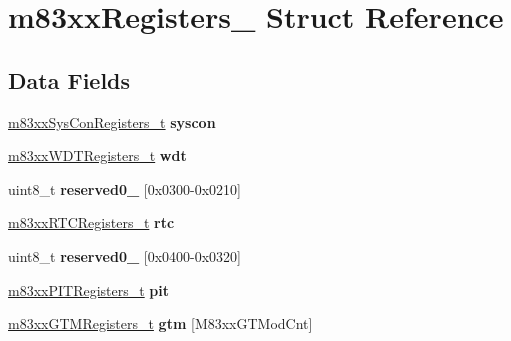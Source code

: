 \hypertarget{structm83xxRegisters__}{}\section{m83xx\+Registers\+\_\+ Struct Reference}
\label{structm83xxRegisters__}
\subsection*{Data Fields}
\begin{DoxyCompactItemize}
\item 
\mbox{\label{structm83xxRegisters___a3db926d60bc4e11d0660814325685067}} 
\mbox{\hyperlink{structm83xxSysConRegisters__}{m83xx\+Sys\+Con\+Registers\+\_\+t}} {\bfseries syscon}
\item 
\mbox{\label{structm83xxRegisters___ad7527072e45a12bfa753819727c296a1}} 
\mbox{\hyperlink{structm83xxWDTRegisters__}{m83xx\+W\+D\+T\+Registers\+\_\+t}} {\bfseries wdt}
\item 
\mbox{\label{structm83xxRegisters___adb3e4fbf90b1b339f04d4fd1d7b5da88}} 
uint8\+\_\+t {\bfseries reserved0\+\_} \mbox{[}0x0300-\/0x0210\mbox{]}
\item 
\mbox{\label{structm83xxRegisters___a16bb1b75ffe2c47d50eb5429d5a50d45}} 
\mbox{\hyperlink{structm83xxRTCRegisters__}{m83xx\+R\+T\+C\+Registers\+\_\+t}} {\bfseries rtc}
\item 
\mbox{\label{structm83xxRegisters___a587ef9fba32a6f0c7e4559eda399c5db}} 
uint8\+\_\+t {\bfseries reserved0\+\_} \mbox{[}0x0400-\/0x0320\mbox{]}
\item 
\mbox{\label{structm83xxRegisters___aea09c58364d56027f010e0b3de49a11d}} 
\mbox{\hyperlink{structm83xxPITRegisters__}{m83xx\+P\+I\+T\+Registers\+\_\+t}} {\bfseries pit}
\item 
\mbox{\label{structm83xxRegisters___a46fe5bd65a6032fd58a90f2f5623129b}} 
\mbox{\hyperlink{structm83xxGTMRegisters__}{m83xx\+G\+T\+M\+Registers\+\_\+t}} {\bfseries gtm} \mbox{[}M83xx\+G\+T\+Mod\+Cnt\mbox{]}
\item 

\end{DoxyCompactItemize}
